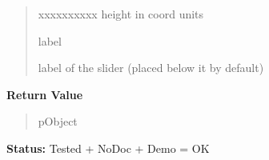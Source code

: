 \begin{boxedminipage}{\funcwidth}
\begin{quote}
\begin{Ventry}{xxxxxxxxxx}
          height in coord units

          \item[label]

          label of the slider (placed below it by default)

        \end{Ventry}

      \end{quote}

      \textbf{Return Value}
    \vspace{-1ex}

      \begin{quote}
      pObject

      \end{quote}

\textbf{Status:} Tested + NoDoc + Demo = OK



    \end{boxedminipage}

    \label{xformslib:library:fl_add_valslider}

    \vspace{0.5ex}

